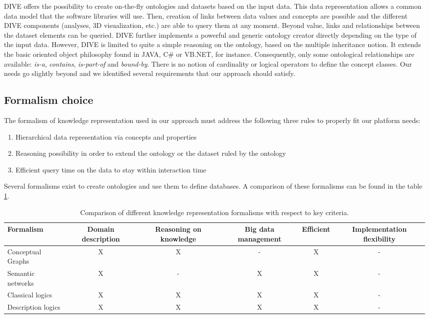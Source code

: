 \documentclass{vgtc}                          %
\begin{document}
DIVE offers the possibility to create on-the-fly ontologies and datasets based on the input data. This data representation allows a common data model that the software libraries will use. Then, creation of links between data values and concepts are possible and the different DIVE components (analyses, 3D visualization, etc.) are able to query them at any moment. Beyond value, links and relationships between the dataset elements can be queried. DIVE further implements a powerful and generic ontology creator directly depending on the type of the input data. However, DIVE is limited to quite a simple reasoning on the ontology, based on the multiple inheritance notion. It extends the basic oriented object philosophy found in JAVA, C\# or VB.NET, for instance. Consequently, only some ontological relationships are available: \textit{is-a}, \textit{contains}, \textit{is-part-of} and \textit{bound-by}. There is no notion of cardinality or logical operators to define the concept classes. Our needs go slightly beyond and we identified several requirements that our approach should satisfy.


\subsection{Formalism choice}

The formalism of knowledge representation used in our approach must address the following three rules to properly fit our platform needs:

\begin{enumerate}
  \item Hierarchical data representation via concepts and properties
  \item Reasoning possibility in order to extend the ontology or the dataset ruled by the ontology
  \item Efficient query time on the data to stay within interaction time
\end{enumerate}

Several formalisms exist to create ontologies and use them to define databases. A comparison of these formalisms can be found in the table \ref{formalisms_comparison}.

\begin{table}[t]
\begin{tabular}{l|*{5}{c|}}
Formalism          & Domain description & Reasoning on knowledge & Big data management & Efficient & Implementation flexibility \\
\hline
Conceptual Graphs  & X & X & - & X & -  \\
Semantic networks  & X & - & X & X & -  \\
Classical logics   & X & X & X & X & -  \\
Description logics & X & X & X & X & -  \\
\end{tabular}
\caption{Comparison of different knowledge representation formalisms with respect to key criteria.}
  \label{formalisms_comparison}
\end{table}
\end{document}

